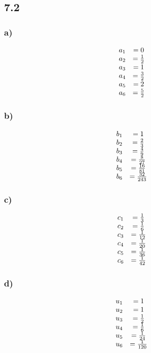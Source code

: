 \documentclass[11pt]{article}
\begin{document}
\subsection*{7.2}
\subsubsection*{a)}
\[
\begin{array}{c c}
a_1 &= 0\\
a_2 &= \frac{1}{2}\\
a_3 &= 1\\
a_4 &= \frac{3}{2}\\
a_5 &= 2\\
a_6 &= \frac{5}{2}\\
\end{array}
\]

\subsubsection*{b)}
\[
\begin{array}{c c}
b_1 &= 1\\
b_2 &= \frac{2}{3}\\
b_3 &= \frac{4}{9}\\
b_4 &= \frac{8}{27}\\
b_5 &= \frac{16}{81}\\
b_6 &= \frac{32}{243}\\
\end{array}
\]

\subsubsection*{c)}
\[
\begin{array}{c c}
c_1 &= \frac{1}{3}\\
c_2 &= \frac{1}{6}\\
c_3 &= \frac{1}{12}\\
c_4 &= \frac{1}{20}\\
c_5 &= \frac{1}{36}\\
c_6 &= \frac{1}{42}\\
\end{array}
\]

\subsubsection*{d)}
\[
\begin{array}{c c}
u_1 &= 1\\
u_2 &= 1\\
u_3 &= \frac{1}{2}\\
u_4 &= \frac{1}{6}\\
u_5 &= \frac{1}{24}\\
u_6 &= \frac{1}{120}\\
\end{array}
\]
\end{document}
